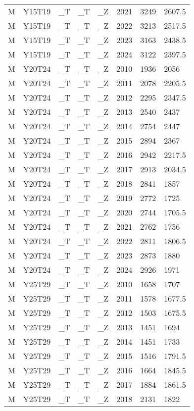 \begin{longtable}[t]{llllllll}
M & Y15T19 & \_T & \_T & \_Z & 2021 & 3249 & 2607.5\\
M & Y15T19 & \_T & \_T & \_Z & 2022 & 3213 & 2517.5\\
M & Y15T19 & \_T & \_T & \_Z & 2023 & 3163 & 2438.5\\
M & Y15T19 & \_T & \_T & \_Z & 2024 & 3122 & 2397.5\\
\addlinespace
M & Y20T24 & \_T & \_T & \_Z & 2010 & 1936 & 2056\\
M & Y20T24 & \_T & \_T & \_Z & 2011 & 2078 & 2205.5\\
M & Y20T24 & \_T & \_T & \_Z & 2012 & 2295 & 2347.5\\
M & Y20T24 & \_T & \_T & \_Z & 2013 & 2540 & 2437\\
M & Y20T24 & \_T & \_T & \_Z & 2014 & 2754 & 2447\\
\addlinespace
M & Y20T24 & \_T & \_T & \_Z & 2015 & 2894 & 2367\\
M & Y20T24 & \_T & \_T & \_Z & 2016 & 2942 & 2217.5\\
M & Y20T24 & \_T & \_T & \_Z & 2017 & 2913 & 2034.5\\
M & Y20T24 & \_T & \_T & \_Z & 2018 & 2841 & 1857\\
M & Y20T24 & \_T & \_T & \_Z & 2019 & 2772 & 1725\\
\addlinespace
M & Y20T24 & \_T & \_T & \_Z & 2020 & 2744 & 1705.5\\
M & Y20T24 & \_T & \_T & \_Z & 2021 & 2762 & 1756\\
M & Y20T24 & \_T & \_T & \_Z & 2022 & 2811 & 1806.5\\
M & Y20T24 & \_T & \_T & \_Z & 2023 & 2873 & 1880\\
M & Y20T24 & \_T & \_T & \_Z & 2024 & 2926 & 1971\\
\addlinespace
M & Y25T29 & \_T & \_T & \_Z & 2010 & 1658 & 1707\\
M & Y25T29 & \_T & \_T & \_Z & 2011 & 1578 & 1677.5\\
M & Y25T29 & \_T & \_T & \_Z & 2012 & 1503 & 1675.5\\
M & Y25T29 & \_T & \_T & \_Z & 2013 & 1451 & 1694\\
M & Y25T29 & \_T & \_T & \_Z & 2014 & 1451 & 1733\\
\addlinespace
M & Y25T29 & \_T & \_T & \_Z & 2015 & 1516 & 1791.5\\
M & Y25T29 & \_T & \_T & \_Z & 2016 & 1664 & 1845.5\\
M & Y25T29 & \_T & \_T & \_Z & 2017 & 1884 & 1861.5\\
M & Y25T29 & \_T & \_T & \_Z & 2018 & 2131 & 1822\\

\end{longtable}
